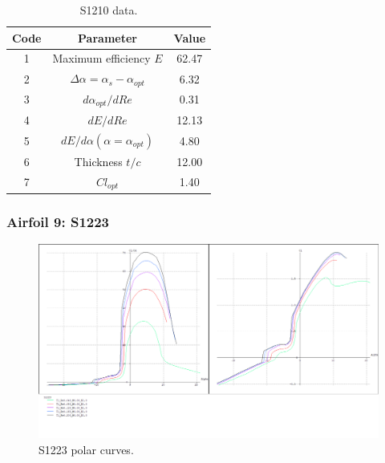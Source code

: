 \documentclass[../TFG_Annex.tex]{subfiles}
\begin{document}
\begin{table}[h!]
	\centering
	\begin{tabular}{c|c|c}
		Code & Parameter                                    & Value  \\ \hline
		1    & Maximum efficiency $E$                      &      62.47         \\
		2    & $\Delta \alpha=\alpha_{s}-\alpha_{opt}$    &           6.32          \\
		3    & ${d\alpha_{opt}}/{dRe}$                     &             0.31     \\
		4    & ${dE}/{dRe}$                                &        12.13           \\
		5    & ${dE}/{d \alpha} (\alpha=\alpha_{opt})$      &           4.80        \\
		6    & Thickness $t/c$                            &              12.00      \\
		7    & $Cl_{opt}$  &   1.40
	\end{tabular}
	\caption{S1210 data.}
	\label{tab:Airf8}
\end{table}

\newpage
\subsubsection{Airfoil 9: S1223}

\begin{figure}[h!]
	\centering
	\includegraphics[width=1\linewidth]{"../../04-Airfoil selection/Imatges airfoils/9-S1223"}
	\caption{S1223 polar curves.}
	\label{fig:9-s1223}
\end{figure}
\end{document}
